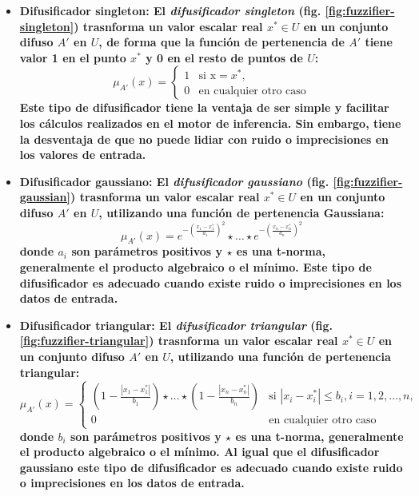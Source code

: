 \begin{itemize}
\item\bfseries Difusificador singleton: \normalfont El \emph{difusificador singleton} (fig. \ref{fig:fuzzifier-singleton}) trasnforma un valor escalar real $x^* \in U$ en un conjunto difuso $A'$ en $U$, de forma que la función de pertenencia de $A'$ tiene valor 1 en el punto $x^*$ y 0 en el resto de puntos de $U$:
\begin{equation}
\mu_{A'}(x) = \begin{cases} 1 & \mbox{si } \mbox{x}=x^*, \\ 0 & \mbox{en cualquier otro caso} \end{cases}
\end{equation}
Este tipo de difusificador tiene la ventaja de ser simple y facilitar los cálculos realizados en el motor de inferencia. Sin embargo, tiene la desventaja de que no puede lidiar con ruido o imprecisiones en los valores de entrada. 
\item\bfseries Difusificador gaussiano: \normalfont El \emph{difusificador gaussiano} (fig. \ref{fig:fuzzifier-gaussian}) trasnforma un valor escalar real $x^* \in U$ en un conjunto difuso $A'$ en $U$, utilizando una función de pertenencia Gaussiana:
\begin{equation}
\mu_{A'}(x) = e^{-(\frac{x_1 - x_1^*}{a_1})^2}\star\ldots\star e^{-(\frac{x_n - x_n^*}{a_n})^2}
\end{equation}
donde $a_i$ son parámetros positivos y $\star$ es una t-norma, generalmente el producto algebraico o el mínimo. Este tipo de difusificador es adecuado cuando existe ruido o imprecisiones en los datos de entrada.
\item\bfseries Difusificador triangular: \normalfont El \emph{difusificador triangular} (fig. \ref{fig:fuzzifier-triangular}) trasnforma un valor escalar real $x^* \in U$ en un conjunto difuso $A'$ en $U$, utilizando una función de pertenencia triangular:
\begin{equation}
\mu_{A'}(x) = \begin{cases} (1 - \frac{|x_1 - x_1^*|}{b_1})\star\ldots\star  (1 - \frac{|x_n - x_n^*|}{b_n}) & \mbox{si } |x_i - x_i^*| \leq b_i, i = 1,2,\ldots,n, \\ 0 & \mbox{en cualquier otro caso} \end{cases}
\end{equation}
donde $b_i$ son parámetros positivos y $\star$ es una t-norma, generalmente el producto algebraico o el mínimo. Al igual que el difusificador gaussiano este tipo de difusificador es adecuado cuando existe ruido o imprecisiones en los datos de entrada.
\end{itemize}

